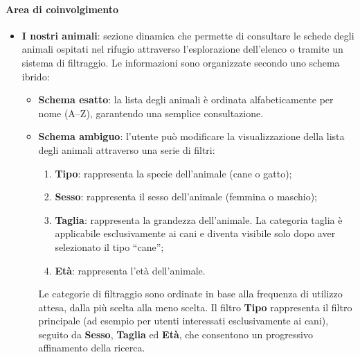 \documentclass[10pt, letterpaper]{article}
\begin{document}
\paragraph{Area di coinvolgimento}
\begin{itemize}
    \item \textbf{I nostri animali}: sezione dinamica che permette di consultare le schede degli animali ospitati nel rifugio attraverso l'esplorazione dell’elenco o tramite un sistema di filtraggio. Le informazioni sono organizzate secondo uno schema ibrido:
    \begin{itemize}
        \item \textbf{Schema esatto}: la lista degli animali è ordinata alfabeticamente per nome (A–Z), garantendo una semplice consultazione.
        \item \textbf{Schema ambiguo}: l'utente può modificare la visualizzazione della lista degli animali attraverso una serie di filtri:
        \begin{enumerate}
            \item \textbf{Tipo}: rappresenta la specie dell'animale (cane o gatto);
            \item \textbf{Sesso}: rappresenta il sesso dell'animale (femmina o maschio);
            \item \textbf{Taglia}: rappresenta la grandezza dell'animale. La categoria taglia è applicabile esclusivamente ai cani e diventa visibile solo dopo aver selezionato il tipo “cane”;
            \item \textbf{Età}: rappresenta l'età dell'animale.
        \end{enumerate}
        Le categorie di filtraggio sono ordinate in base alla frequenza di utilizzo attesa, dalla più scelta alla meno scelta. Il filtro \textbf{Tipo} rappresenta il filtro principale (ad esempio per utenti interessati esclusivamente ai cani), seguito da \textbf{Sesso}, \textbf{Taglia} ed \textbf{Età}, che consentono un progressivo affinamento della ricerca.
    \end{itemize}


\end{itemize}
\end{document}
